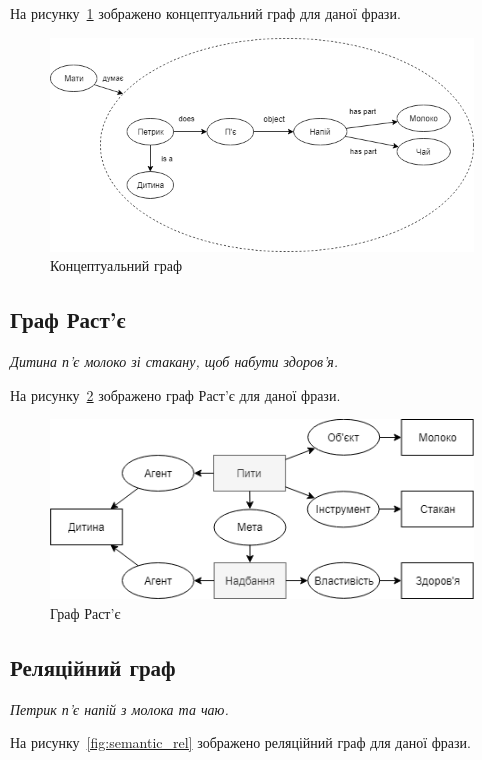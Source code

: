 На рисунку~\ref{fig:semantic_con} зображено концептуальний граф для даної фрази.

\begin{figure}[H]
    \centering
        \includegraphics[width=\linewidth]{semantic_con}
    \caption{Концептуальний граф}
    \label{fig:semantic_con}
\end{figure}

\subsection{Граф Раст'є}
\textit{Дитина п'є молоко зі стакану, щоб набути здоров'я.}

На рисунку~\ref{fig:semantic_ras} зображено граф Раст'є для даної фрази.

\begin{figure}[H]
    \centering
        \includegraphics[width=\linewidth]{semantic_ras}
    \caption{Граф Раст'є}
    \label{fig:semantic_ras}
\end{figure}

\subsection{Реляційний граф}
\textit{Петрик п'є напій з молока та чаю.}

На рисунку~\ref{fig:semantic_rel} зображено реляційний граф для даної фрази.

